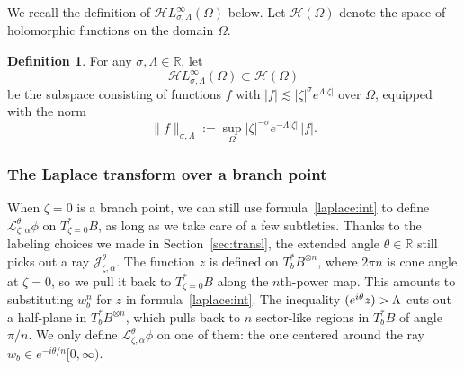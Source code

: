 \documentclass{article}
\let\Re\relax
\DeclareMathOperator{\Re}{Re}
\newcommand{\holo}{\mathcal{H}}
\newcommand{\singexp}[2]{\mathcal{H}L^\infty_{#1, #2}}
\newcommand{\R}{\mathbb{R}}
\newcommand{\laplace}{\mathcal{L}}
\theoremstyle{definition}
\newtheorem{definition}{Definition}[section]
\theoremstyle{plain}
\newenvironment{revised}{\color{DarkBlue}}{\color{black}}
\newenvironment{revised}{}{}
\begin{document}
\begin{revised}
We recall the definition of $\singexp{\sigma}{\Lambda}(\Omega)$ below. Let $\holo(\Omega)$ denote the space of holomorphic functions on the domain $\Omega$. 
\begin{definition}\label{def:HL_inf}
For any $\sigma, \Lambda \in \R$, let
\[ \singexp{\sigma}{\Lambda}(\Omega) \subset \holo(\Omega) \]
be the subspace consisting of functions $f$ with $|f| \lesssim |\zeta|^\sigma e^{\Lambda|\zeta|}$ over $\Omega$, equipped with the norm
\[ \|f\|_{\sigma,\Lambda} := \sup_\Omega |\zeta|^{-\sigma} e^{-\Lambda|\zeta|}\,|f|. \]       
\end{definition} 
\end{revised}
\subsubsection{The Laplace transform over a branch point}
When $\zeta = 0$ is a branch point, we can still use formula~\eqref{laplace:int} to define $\laplace_{\zeta, \alpha}^\theta \phi$ on $T_{\zeta = 0}^*B$, as long as we take care of a few subtleties. Thanks to the labeling choices we made in Section~\ref{sec:transl}, the extended angle $\theta \in \R$ still picks out a ray $\mathcal{J}_{\zeta, \alpha}^\theta$. The function $z$ is defined on $T_b^*B^{\otimes n}$, where $2\pi n$ is cone angle at $\zeta = 0$, so we pull it back to $T^*_{\zeta = 0} B$ along the $n$th-power map. This amounts to substituting $w_b^n$ for $z$ in formula~\eqref{laplace:int}. The inequality $\Re(e^{i\theta} z) > \Lambda$ cuts out a half-plane in $T_b^*B^{\otimes n}$, which pulls back to $n$ sector-like regions in $T_b^*B$ of angle $\pi/n$. We only define $\laplace_{\zeta, \alpha}^\theta \phi$ on one of them: the one centered around the ray $w_b \in e^{-i\theta/n}[0, \infty)$.
\end{document}
